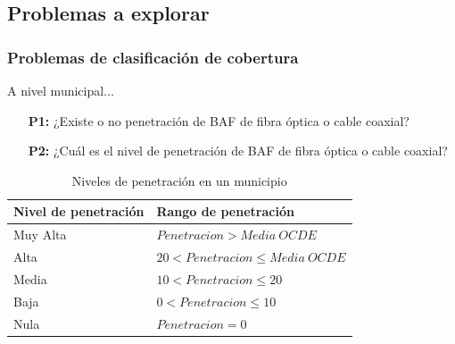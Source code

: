 \documentclass[xcolor=dvipsnames, compress]{beamer}
\begin{document}
\begin{frame}
\section{Problemas a explorar}
\frametitle{Problemas de clasificación de cobertura}

A  nivel municipal...

\begin{itemize}
	\item[\textbf{P1:}] ¿Existe o no penetración de BAF de fibra óptica o cable coaxial?
	\item[\textbf{P2:}] ¿Cuál es el nivel de penetración de BAF de fibra óptica o cable coaxial?
\end{itemize}

\begin{table}[tbhp]
	\centering
	\caption{Niveles de penetración en un municipio\label{table:clasifpen}}
	\begin{tabular}{@{}ll@{}}
		\hline
		Nivel de penetración & Rango  de penetración            \\ \hline
		Muy Alta  & $Penetracion > Media \ OCDE$         \\ 
		Alta    & $20 < Penetracion \leq Media \ OCDE$ \\ 
		Media    & $10 < Penetracion \leq 20$  \\ 
		Baja      & $0 < Penetracion \leq 10$  \\ 
		Nula      & $Penetracion =0$            \\ \hline
	\end{tabular}
\end{table}

\end{frame}
\end{document}
